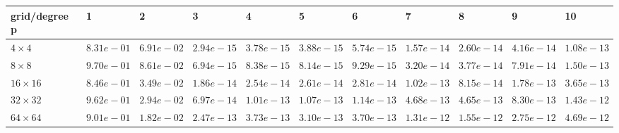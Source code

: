 \begin{tabular}{lllllllllll}
\hline
 grid/degree p   & 1          & 2          & 3          & 4          & 5          & 6          & 7          & 8          & 9          & 10         \\
\hline
 $4 \times 4$    & $8.31e-01$ & $6.91e-02$ & $2.94e-15$ & $3.78e-15$ & $3.88e-15$ & $5.74e-15$ & $1.57e-14$ & $2.60e-14$ & $4.16e-14$ & $1.08e-13$ \\
 $8 \times 8$    & $9.70e-01$ & $8.61e-02$ & $6.94e-15$ & $8.38e-15$ & $8.14e-15$ & $9.29e-15$ & $3.20e-14$ & $3.77e-14$ & $7.91e-14$ & $1.50e-13$ \\
 $16 \times 16$  & $8.46e-01$ & $3.49e-02$ & $1.86e-14$ & $2.54e-14$ & $2.61e-14$ & $2.81e-14$ & $1.02e-13$ & $8.15e-14$ & $1.78e-13$ & $3.65e-13$ \\
 $32 \times 32$  & $9.62e-01$ & $2.94e-02$ & $6.97e-14$ & $1.01e-13$ & $1.07e-13$ & $1.14e-13$ & $4.68e-13$ & $4.65e-13$ & $8.30e-13$ & $1.43e-12$ \\
 $64 \times 64$  & $9.01e-01$ & $1.82e-02$ & $2.47e-13$ & $3.73e-13$ & $3.10e-13$ & $3.70e-13$ & $1.31e-12$ & $1.55e-12$ & $2.75e-12$ & $4.69e-12$ \\
\hline
\end{tabular}